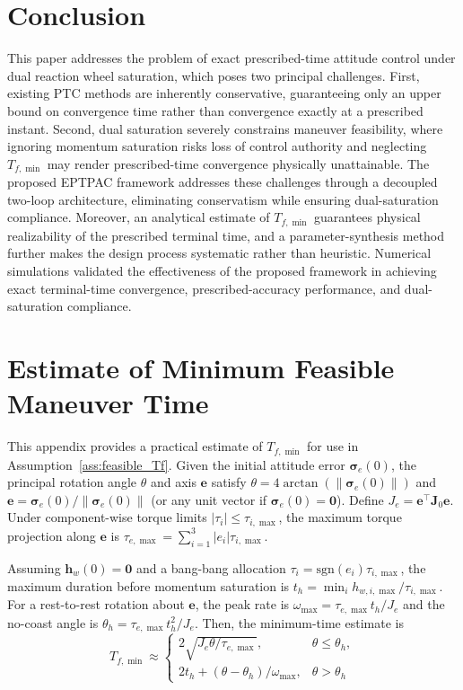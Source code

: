 \documentclass[journal]{new-aiaa}
\begin{document}
\newpage
\section{Conclusion}
\label{section:conclusion}
This paper addresses the problem of exact prescribed-time attitude control under dual reaction wheel saturation, which poses two principal challenges. First, existing PTC methods are inherently conservative, guaranteeing only an upper bound on convergence time rather than convergence exactly at a prescribed instant. Second, dual saturation severely constrains maneuver feasibility, where ignoring momentum saturation risks loss of control authority and neglecting $T_{f,\min}$ may render prescribed-time convergence physically unattainable. The proposed EPTPAC framework addresses these challenges through a decoupled two-loop architecture, eliminating conservatism while ensuring dual-saturation compliance. Moreover, an analytical estimate of $T_{f,\min}$ guarantees physical realizability of the prescribed terminal time, and a parameter-synthesis method further makes the design process systematic rather than heuristic.
Numerical simulations validated the effectiveness of the proposed framework in achieving exact terminal-time convergence, prescribed-accuracy performance, and dual-saturation compliance.

\appendix
\section{Estimate of Minimum Feasible Maneuver Time}
\label{app:bangbang}

This appendix provides a practical estimate of $T_{f,\min}$ for use in Assumption~\ref{ass:feasible_Tf}.
Given the initial attitude error $\boldsymbol{\sigma}_e(0)$, the principal rotation angle $\theta$ and axis $\boldsymbol{e}$ satisfy
$\theta = 4\arctan(\|\boldsymbol{\sigma}_e(0)\|)$ and
$\boldsymbol{e} = \boldsymbol{\sigma}_e(0)/\|\boldsymbol{\sigma}_e(0)\|$ (or any unit vector if $\boldsymbol{\sigma}_e(0)=\boldsymbol{0}$).
Define $J_e = \boldsymbol{e}^\top\boldsymbol{J}_0\boldsymbol{e}$.
Under component-wise torque limits $|\tau_i|\le\tau_{i,\max}$, the maximum torque projection along $\boldsymbol{e}$ is
$\tau_{e,\max}= \sum_{i=1}^{3}|e_i|\tau_{i,\max}$.

Assuming $\boldsymbol{h}_w(0)=\boldsymbol{0}$ and a bang-bang allocation $\tau_i=\mathrm{sgn}(e_i)\tau_{i,\max}$,
the maximum duration before momentum saturation is
$t_h = \min_i h_{w,i,\max}/\tau_{i,\max}$.
For a rest-to-rest rotation about $\boldsymbol{e}$,
the peak rate is $\omega_{\max}= \tau_{e,\max}t_h/J_e$
and the no-coast angle is $\theta_h = \tau_{e,\max}t_h^2/J_e$.
Then, the minimum-time estimate is
\begin{equation}
T_{f,\min}\approx
\begin{cases}
2\sqrt{J_e\theta/\tau_{e,\max}}, & \theta \le \theta_h,\\[6pt]
2t_h + (\theta-\theta_h)/\omega_{\max}, & \theta > \theta_h
\end{cases}
\label{eq:app_Tmin_piecewise}
\end{equation}
\end{document}
